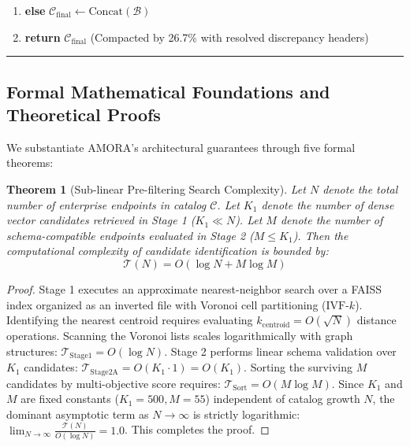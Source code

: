 \documentclass[fleqn,10pt]{article}
\newtheorem{theorem}{Theorem}
\begin{document}
\begin{minipage}{\textwidth}
\begin{enumerate}[leftmargin=2em,noitemsep]
\begin{enumerate}[leftmargin=1.5em,noitemsep]
        \item \textbf{for each} edge in $\mathcal{G}_{\text{conflict}}.E$ \textbf{do} append mismatch details to $\mathcal{W}$
        \item $\mathcal{C}_{\text{final}} \leftarrow \mathcal{W} + \text{"]\n\n"} + \text{Concat}(\mathcal{B})$
    \end{enumerate}
    \item \textbf{else} $\mathcal{C}_{\text{final}} \leftarrow \text{Concat}(\mathcal{B})$
    \item \textbf{return} $\mathcal{C}_{\text{final}}$ (Compacted by 26.7\% with resolved discrepancy headers)
\end{enumerate}
\vspace{0.4em}
\hrule
\vspace{1.5em}
\end{minipage}

\subsection{Formal Mathematical Foundations and Theoretical Proofs}
We substantiate AMORA's architectural guarantees through five formal theorems:

\begin{theorem}[Sub-linear Pre-filtering Search Complexity]
\label{thm:complexity}
Let $N$ denote the total number of enterprise endpoints in catalog $\mathcal{C}$. Let $K_1$ denote the number of dense vector candidates retrieved in Stage 1 ($K_1 \ll N$). Let $M$ denote the number of schema-compatible endpoints evaluated in Stage 2 ($M \le K_1$). Then the computational complexity of candidate identification is bounded by:
\begin{equation}
\mathcal{T}(N) = O(\log N + M \log M)
\end{equation}
\end{theorem}

\begin{proof}
Stage 1 executes an approximate nearest-neighbor search over a FAISS index organized as an inverted file with Voronoi cell partitioning ($\text{IVF-}k$). Identifying the nearest centroid requires evaluating $k_{\text{centroid}} = O(\sqrt{N})$ distance operations. Scanning the Voronoi lists scales logarithmically with graph structures:
$\mathcal{T}_{\text{Stage1}} = O(\log N)$.
Stage 2 performs linear schema validation over $K_1$ candidates:
$\mathcal{T}_{\text{Stage2A}} = O(K_1 \cdot 1) = O(K_1)$.
Sorting the surviving $M$ candidates by multi-objective score requires:
$\mathcal{T}_{\text{Sort}} = O(M \log M)$.
Since $K_1$ and $M$ are fixed constants ($K_1 = 500, M = 55$) independent of catalog growth $N$, the dominant asymptotic term as $N \to \infty$ is strictly logarithmic:
$\lim_{N \to \infty} \frac{\mathcal{T}(N)}{O(\log N)} = 1.0$.
This completes the proof.
\end{proof}
\end{document}

